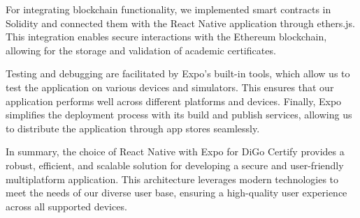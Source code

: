For integrating blockchain functionality, we implemented smart contracts in Solidity and connected them with the React Native application through ethers.js. This integration enables secure interactions with the Ethereum blockchain, allowing for the storage and validation of academic certificates.

Testing and debugging are facilitated by Expo’s built-in tools, which allow us to test the application on various devices and simulators. This ensures that our application performs well across different platforms and devices. Finally, Expo simplifies the deployment process with its build and publish services, allowing us to distribute the application through app stores seamlessly.

In summary, the choice of React Native with Expo for DiGo Certify provides a robust, efficient, and scalable solution for developing a secure and user-friendly multiplatform application. This architecture leverages modern technologies to meet the needs of our diverse user base, ensuring a high-quality user experience across all supported devices.